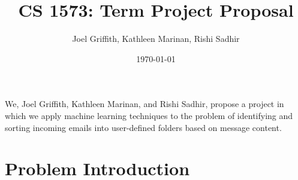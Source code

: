 \documentclass[11pt]{article}
\title{CS 1573: Term Project Proposal}
\author{Joel Griffith, Kathleen Marinan, Rishi Sadhir}
\date{\today}
\begin{document}
\maketitle

\setcounter{tocdepth}{3}
\tableofcontents
\vspace*{1cm}


We, Joel Griffith, Kathleen Marinan, and Rishi Sadhir, propose a project in which we apply machine learning techniques to the problem of identifying and sorting incoming emails into user-defined folders based on message content.

\section{Problem Introduction}
\label{sec-1}
\end{document}
